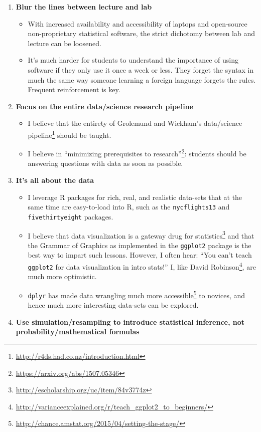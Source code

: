 \documentclass[
  12pt, krantz2,
]{krantz}
\providecommand{\tightlist}{%
  \setlength{\itemsep}{0pt}\setlength{\parskip}{0pt}}
\renewcommand{\href}[2]{#2\footnote{\url{#1}}}
\begin{document}
\begin{enumerate}
\def\labelenumi{\arabic{enumi}.}
\tightlist
\item
  \textbf{Blur the lines between lecture and lab}

  \begin{itemize}
  \tightlist
  \item
    With increased availability and accessibility of laptops and open-source non-proprietary statistical software, the strict dichotomy between lab and lecture can be loosened.
  \item
    It's much harder for students to understand the importance of using software if they only use it once a week or less. They forget the syntax in much the same way someone learning a foreign language forgets the rules. Frequent reinforcement is key.
  \end{itemize}
\item
  \textbf{Focus on the entire data/science research pipeline}

  \begin{itemize}
  \tightlist
  \item
    I believe that the entirety of Grolemund and Wickham's \href{http://r4ds.had.co.nz/introduction.html}{data/science pipeline} should be taught.
  \item
    I believe in \href{https://arxiv.org/abs/1507.05346}{``minimizing prerequisites to research''}: students should be answering questions with data as soon as possible.
  \end{itemize}
\item
  \textbf{It's all about the data}

  \begin{itemize}
  \tightlist
  \item
    I leverage R packages for rich, real, and realistic data-sets that at the same time are easy-to-load into R, such as the \texttt{nycflights13} and \texttt{fivethirtyeight} packages.
  \item
    I believe that \href{http://escholarship.org/uc/item/84v3774z}{data visualization is a gateway drug for statistics} and that the Grammar of Graphics as implemented in the \texttt{ggplot2} package is the best way to impart such lessons. However, I often hear: ``You can't teach \texttt{ggplot2} for data visualization in intro stats!'' I, like \href{http://varianceexplained.org/r/teach_ggplot2_to_beginners/}{David Robinson}, are much more optimistic.
  \item
    \texttt{dplyr} has made data wrangling much more \href{http://chance.amstat.org/2015/04/setting-the-stage/}{accessible} to novices, and hence much more interesting data-sets can be explored.
  \end{itemize}
\item
  \textbf{Use simulation/resampling to introduce statistical inference, not probability/mathematical formulas}


\end{enumerate}
\end{document}
